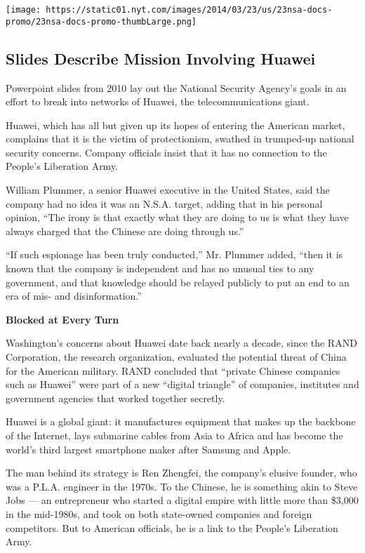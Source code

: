 \href{https://www.nytimes.com/interactive/2014/03/23/world/asia/23nsa-docs.html}{}

\texttt{[image: https://static01.nyt.com/images/2014/03/23/us/23nsa-docs-promo/23nsa-docs-promo-thumbLarge.png]}

\hypertarget{slides-describe-mission-involving-huawei}{%
\subsection{Slides Describe Mission Involving
Huawei}\label{slides-describe-mission-involving-huawei}}

Powerpoint slides from 2010 lay out the National Security Agency's goals
in an effort to break into networks of Huawei, the telecommunications
giant.

Huawei, which has all but given up its hopes of entering the American
market, complains that it is the victim of protectionism, swathed in
trumped-up national security concerns. Company officials insist that it
has no connection to the People's Liberation Army.

William Plummer, a senior Huawei executive in the United States, said
the company had no idea it was an N.S.A. target, adding that in his
personal opinion, ``The irony is that exactly what they are doing to us
is what they have always charged that the Chinese are doing through
us.''

``If such espionage has been truly conducted,'' Mr. Plummer added,
``then it is known that the company is independent and has no unusual
ties to any government, and that knowledge should be relayed publicly to
put an end to an era of mis- and disinformation.''

\textbf{Blocked at Every Turn}

Washington's concerns about Huawei date back nearly a decade, since the
RAND Corporation, the research organization, evaluated the potential
threat of China for the American military. RAND concluded that ``private
Chinese companies such as Huawei'' were part of a new ``digital
triangle'' of companies, institutes and government agencies that worked
together secretly.

Huawei is a global giant: it manufactures equipment that makes up the
backbone of the Internet, lays submarine cables from Asia to Africa and
has become the world's third largest smartphone maker after Samsung and
Apple.

The man behind its strategy is Ren Zhengfei, the company's elusive
founder, who was a P.L.A. engineer in the 1970s. To the Chinese, he is
something akin to Steve Jobs --- an entrepreneur who started a digital
empire with little more than \$3,000 in the mid-1980s, and took on both
state-owned companies and foreign competitors. But to American
officials, he is a link to the People's Liberation Army.


